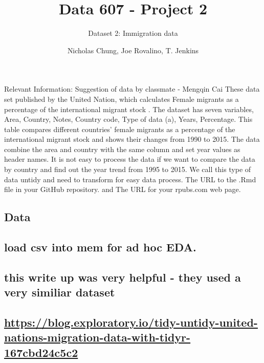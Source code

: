 \documentclass[]{article}
\title{Data 607 - Project 2}
\subtitle{Dataset 2: Immigration data}
\author{Nicholas Chung, Joe Rovalino, T. Jenkins}
\date{}
\begin{document}
\maketitle

{
\setcounter{tocdepth}{2}
\tableofcontents
}
Relevant Information: Suggestion of data by classmate - Mengqin Cai
These data set published by the United Nation, which calculates Female
migrants as a percentage of the international migrant stock . The
dataset has seven variables, Area, Country, Notes, Country code, Type of
data (a), Years, Percentage. This table compares different countries'
female migrants as a percentage of the international migrant stock and
shows their changes from 1990 to 2015. The data combine the area and
country with the same column and set year values as header names. It is
not easy to process the data if we want to compare the data by country
and find out the year trend from 1995 to 2015. We call this type of data
untidy and need to transform for easy data process. The URL to the .Rmd
file in your GitHub repository. and The URL for your rpubs.com web page.

\hypertarget{data}{%
\subsection{Data}\label{data}}

\hypertarget{load-csv-into-mem-for-ad-hoc-eda.}{%
\subsection{load csv into mem for ad hoc
EDA.}\label{load-csv-into-mem-for-ad-hoc-eda.}}

\hypertarget{this-write-up-was-very-helpful---they-used-a-very-similiar-dataset}{%
\subsection{this write up was very helpful - they used a very similiar
dataset}\label{this-write-up-was-very-helpful---they-used-a-very-similiar-dataset}}

\hypertarget{httpsblog.exploratory.iotidy-untidy-united-nations-migration-data-with-tidyr-167cbd24c5c2}{%
\subsection{\texorpdfstring{\url{https://blog.exploratory.io/tidy-untidy-united-nations-migration-data-with-tidyr-167cbd24c5c2}}{https://blog.exploratory.io/tidy-untidy-united-nations-migration-data-with-tidyr-167cbd24c5c2}}\label{httpsblog.exploratory.iotidy-untidy-united-nations-migration-data-with-tidyr-167cbd24c5c2}}
\end{document}
